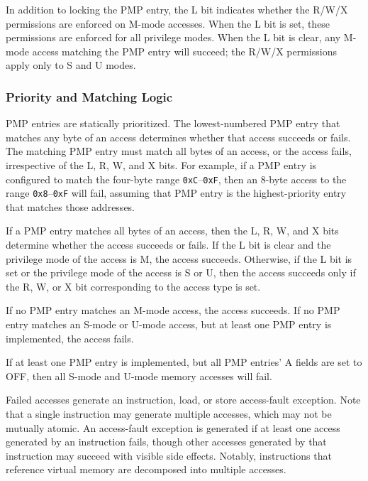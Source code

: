 In addition to locking the PMP entry, the L bit indicates whether the R/W/X
permissions are enforced on M-mode accesses.  When the L bit is set, these
permissions are enforced for all privilege modes.  When the L bit is clear,
any M-mode access matching the PMP entry will succeed; the R/W/X
permissions apply only to S and U modes.

\subsubsection*{Priority and Matching Logic}

PMP entries are statically prioritized.  The lowest-numbered PMP entry that
matches any byte of an access determines whether that access succeeds or
fails.  The matching PMP entry must match all bytes of an access, or the
access fails, irrespective of the L, R, W, and X bits.  For example, if a PMP
entry is configured to match the four-byte range {\tt 0xC}--{\tt 0xF}, then an
8-byte access to the range {\tt 0x8}--{\tt 0xF} will fail, assuming that
PMP entry is the highest-priority entry that matches those addresses.

If a PMP entry matches all bytes of an access, then the L, R, W, and X bits
determine whether the access succeeds or fails.  If the L bit is clear and the
privilege mode of the access is M, the access succeeds.  Otherwise, if the
L bit is set or the privilege mode of the access is S or U, then the access
succeeds only if the R, W, or X bit corresponding to the access type is set.

If no PMP entry matches an M-mode access, the access succeeds.  If no PMP
entry matches an S-mode or U-mode access, but at least one PMP entry is
implemented, the access fails.

\begin{commentary}
If at least one PMP entry is implemented, but all PMP entries' A fields are
set to OFF, then all S-mode and U-mode memory accesses will fail.
\end{commentary}

Failed accesses generate an instruction, load, or store access-fault exception.  Note
that a single instruction may generate multiple accesses, which may not be
mutually atomic.  An access-fault exception is generated if at least one access
generated by an instruction fails, though other accesses generated by that
instruction may succeed with visible side effects.  Notably, instructions that
reference virtual memory are decomposed into multiple accesses.

